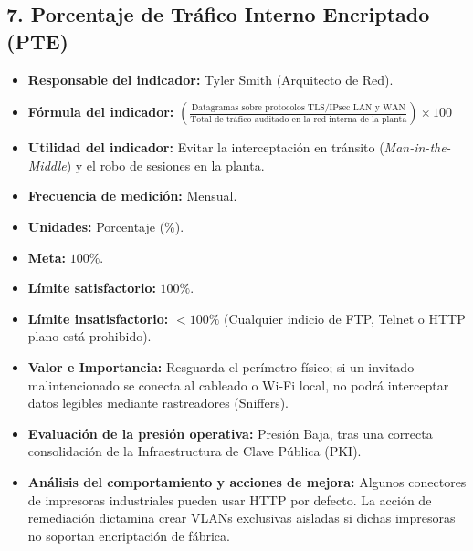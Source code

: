 \documentclass[11pt,a4paper]{article}
\begin{document}
\subsection{7. Porcentaje de Tráfico Interno Encriptado (PTE)}
\begin{itemize}[label={--}, itemsep=0.1cm]
    \item \textbf{Responsable del indicador:} Tyler Smith (Arquitecto de Red).
    \item \textbf{Fórmula del indicador:} $\left(\frac{\text{Datagramas sobre protocolos TLS/IPsec LAN y WAN}}{\text{Total de tráfico auditado en la red interna de la planta}}\right) \times 100$
    \item \textbf{Utilidad del indicador:} Evitar la interceptación en tránsito (\textit{Man-in-the-Middle}) y el robo de sesiones en la planta.
    \item \textbf{Frecuencia de medición:} Mensual.
    \item \textbf{Unidades:} Porcentaje (\%).
    \item \textbf{Meta:} $100\%$.
    \item \textbf{Límite satisfactorio:} $100\%$.
    \item \textbf{Límite insatisfactorio:} $< 100\%$ (Cualquier indicio de FTP, Telnet o HTTP plano está prohibido).
    \item \textbf{Valor e Importancia:} Resguarda el perímetro físico; si un invitado malintencionado se conecta al cableado o Wi-Fi local, no podrá interceptar datos legibles mediante rastreadores (Sniffers).
    \item \textbf{Evaluación de la presión operativa:} Presión Baja, tras una correcta consolidación de la Infraestructura de Clave Pública (PKI).
    \item \textbf{Análisis del comportamiento y acciones de mejora:} Algunos conectores de impresoras industriales pueden usar HTTP por defecto. La acción de remediación dictamina crear VLANs exclusivas aisladas si dichas impresoras no soportan encriptación de fábrica.
\end{itemize}
\end{document}
